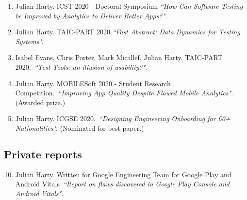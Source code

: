\begin{enumerate}
    \item Julian Harty. ICST 2020 - Doctoral Symposium \emph{``How Can Software Testing be Improved by Analytics to Deliver Better Apps?"}.
    
    \item Julian Harty. TAIC-PART 2020 \emph{``Fast Abstract: Data Dynamics for Testing Systems"}.
    
    \item Isabel Evans, Chris Porter, Mark Micallef, Julian Harty. TAIC-PART 2020.~\emph{``Test Tools: an illusion of usability?"}.
    
    \item Julian Harty. MOBILESoft 2020 - Student Research Competition.~\emph{``Improving App Quality Despite Flawed Mobile Analytics"}. (Awarded  prize.)
    
    \item Julian Harty. ICGSE 2020.~\emph{``Designing Engineering Onboarding for 60+ Nationalities"}. (Nominated for best paper.)

\end{enumerate}

\subsection{Private reports}
\begin{enumerate}

    \setcounter{enumi}{9}
    \item Julian Harty. Written for Google Engineering Team for Google Play and Android Vitals~\emph{``Report on flaws discovered in Google Play Console and Android Vitals"}.

\end{enumerate}

